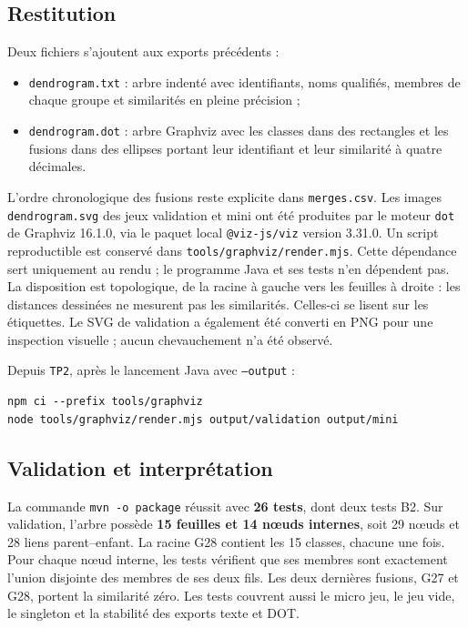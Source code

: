 \documentclass[11pt,a4paper]{article}
\begin{document}
\subsection{Restitution}
Deux fichiers s'ajoutent aux exports précédents :
\begin{itemize}
\item \texttt{dendrogram.txt} : arbre indenté avec identifiants, noms qualifiés,
membres de chaque groupe et similarités en pleine précision ;
\item \texttt{dendrogram.dot} : arbre Graphviz avec les classes dans des
rectangles et les fusions dans des ellipses portant leur identifiant et leur
similarité à quatre décimales.
\end{itemize}
L'ordre chronologique des fusions reste explicite dans \texttt{merges.csv}.
Les images \texttt{dendrogram.svg} des jeux validation et mini ont été produites
par le moteur \texttt{dot} de Graphviz 16.1.0, via le paquet local
\texttt{@viz-js/viz} version 3.31.0. Un script reproductible est conservé dans
\texttt{tools/graphviz/render.mjs}. Cette dépendance sert uniquement au rendu ;
le programme Java et ses tests n'en dépendent pas.
La disposition est topologique, de la racine à gauche vers les feuilles à
droite : les distances dessinées ne mesurent pas les similarités. Celles-ci
se lisent sur les étiquettes. Le SVG de validation a également été converti
en PNG pour une inspection visuelle ; aucun chevauchement n'a été observé.

Depuis \texttt{TP2}, après le lancement Java avec \texttt{--output} :
\begin{verbatim}
npm ci --prefix tools/graphviz
node tools/graphviz/render.mjs output/validation output/mini
\end{verbatim}

\subsection{Validation et interprétation}
La commande \texttt{mvn -o package} réussit avec \textbf{26 tests}, dont deux
tests B2. Sur validation, l'arbre possède \textbf{15 feuilles et 14 nœuds
internes}, soit 29 nœuds et 28 liens parent--enfant. La racine G28 contient
les 15 classes, chacune une fois. Pour chaque nœud interne, les tests
vérifient que ses membres sont exactement l'union disjointe des membres de
ses deux fils. Les deux dernières fusions, G27 et G28, portent la similarité
zéro. Les tests couvrent aussi le micro jeu, le jeu vide, le singleton et
la stabilité des exports texte et DOT.
\end{document}
